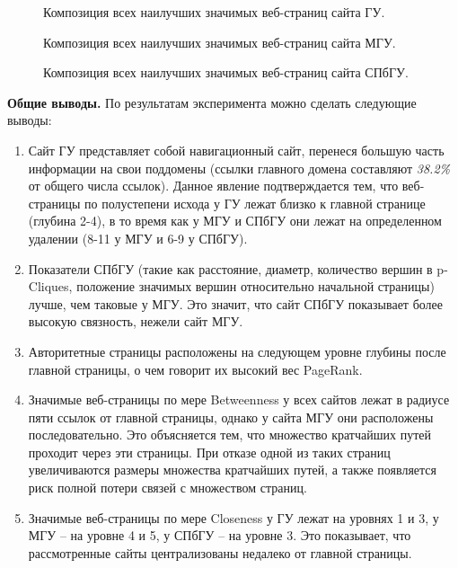 \begin{figure}[ht]
	\caption{Композиция всех наилучших значимых веб-страниц сайта ГУ.}\label{fig:harvardUComposition}
\end{figure}

\begin{figure}[ht]
	\caption{Композиция всех наилучших значимых веб-страниц сайта МГУ.}\label{fig:moscowSUComposition}
\end{figure}

\begin{figure}[ht]
	\caption{Композиция всех наилучших значимых веб-страниц сайта СПбГУ.}\label{fig:spbUComposition}
\end{figure}

\textbf{Общие выводы.} По результатам эксперимента можно сделать следующие выводы:
\begin{enumerate}
	\item Сайт ГУ представляет собой навигационный сайт, перенеся большую часть информации на свои поддомены (ссылки главного домена составляют \textit{38.2\%} от общего числа ссылок). Данное явление подтверждается тем, что веб-страницы по полустепени исхода у ГУ лежат близко к главной странице (глубина 2-4), в то время как у МГУ и СПбГУ они лежат на определенном удалении (8-11 у МГУ и 6-9 у СПбГУ).
	\item Показатели СПбГУ (такие как расстояние, диаметр, количество вершин в p-Cliques, положение значимых вершин относительно начальной страницы) лучше, чем таковые у МГУ. Это значит, что сайт СПбГУ показывает более высокую связность, нежели сайт МГУ.
	\item Авторитетные страницы расположены на следующем уровне глубины после главной страницы, о чем говорит их высокий вес PageRank.
	\item Значимые веб-страницы по мере Betweenness у всех сайтов лежат в радиусе пяти ссылок от главной страницы, однако у сайта МГУ они расположены последовательно. Это объясняется тем, что множество кратчайших путей проходит через эти страницы. При отказе одной из таких страниц увеличиваются размеры множества кратчайших путей, а также появляется риск полной потери связей с множеством страниц.
	\item Значимые веб-страницы по мере Closeness у ГУ лежат на уровнях 1 и 3, у МГУ -- на уровне 4 и 5, у СПбГУ -- на уровне 3. Это показывает, что рассмотренные сайты централизованы недалеко от главной страницы.
\end{enumerate}

